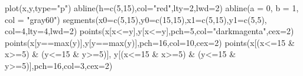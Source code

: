 \documentclass[
]{article}
\newenvironment{Shaded}{\begin{snugshade}}{\end{snugshade}}
\newcommand{\AttributeTok}[1]{\textcolor[rgb]{0.77,0.63,0.00}{#1}}
\newcommand{\DecValTok}[1]{\textcolor[rgb]{0.00,0.00,0.81}{#1}}
\newcommand{\FunctionTok}[1]{\textcolor[rgb]{0.00,0.00,0.00}{#1}}
\newcommand{\NormalTok}[1]{#1}
\newcommand{\SpecialCharTok}[1]{\textcolor[rgb]{0.00,0.00,0.00}{#1}}
\newcommand{\StringTok}[1]{\textcolor[rgb]{0.31,0.60,0.02}{#1}}
\theoremstyle{remark}
\begin{document}
\begin{Shaded}
\begin{Highlighting}[]
\FunctionTok{plot}\NormalTok{(x,y,}\AttributeTok{type=}\StringTok{"p"}\NormalTok{)}
\FunctionTok{abline}\NormalTok{(}\AttributeTok{h=}\FunctionTok{c}\NormalTok{(}\DecValTok{5}\NormalTok{,}\DecValTok{15}\NormalTok{),}\AttributeTok{col=}\StringTok{"red"}\NormalTok{,}\AttributeTok{lty=}\DecValTok{2}\NormalTok{,}\AttributeTok{lwd=}\DecValTok{2}\NormalTok{)}
\FunctionTok{abline}\NormalTok{(}\AttributeTok{a =} \DecValTok{0}\NormalTok{, }\AttributeTok{b =} \DecValTok{1}\NormalTok{, }\AttributeTok{col =} \StringTok{"gray60"}\NormalTok{)}
\FunctionTok{segments}\NormalTok{(}\AttributeTok{x0=}\FunctionTok{c}\NormalTok{(}\DecValTok{5}\NormalTok{,}\DecValTok{15}\NormalTok{),}\AttributeTok{y0=}\FunctionTok{c}\NormalTok{(}\DecValTok{15}\NormalTok{,}\DecValTok{15}\NormalTok{),}\AttributeTok{x1=}\FunctionTok{c}\NormalTok{(}\DecValTok{5}\NormalTok{,}\DecValTok{15}\NormalTok{),}\AttributeTok{y1=}\FunctionTok{c}\NormalTok{(}\DecValTok{5}\NormalTok{,}\DecValTok{5}\NormalTok{),}
\AttributeTok{col=}\DecValTok{4}\NormalTok{,}\AttributeTok{lty=}\DecValTok{4}\NormalTok{,}\AttributeTok{lwd=}\DecValTok{2}\NormalTok{)}
\FunctionTok{points}\NormalTok{(x[x}\SpecialCharTok{\textless{}=}\NormalTok{y],y[x}\SpecialCharTok{\textless{}=}\NormalTok{y],}\AttributeTok{pch=}\DecValTok{5}\NormalTok{,}\AttributeTok{col=}\StringTok{"darkmagenta"}\NormalTok{,}\AttributeTok{cex=}\DecValTok{2}\NormalTok{)}
\FunctionTok{points}\NormalTok{(x[y}\SpecialCharTok{==}\FunctionTok{max}\NormalTok{(y)],y[y}\SpecialCharTok{==}\FunctionTok{max}\NormalTok{(y)],}\AttributeTok{pch=}\DecValTok{16}\NormalTok{,}\AttributeTok{col=}\DecValTok{10}\NormalTok{,}\AttributeTok{cex=}\DecValTok{2}\NormalTok{)}
\FunctionTok{points}\NormalTok{(x[(x}\SpecialCharTok{\textless{}=}\DecValTok{15} \SpecialCharTok{\&}\NormalTok{ x}\SpecialCharTok{\textgreater{}=}\DecValTok{5}\NormalTok{) }\SpecialCharTok{\&}\NormalTok{ (y}\SpecialCharTok{\textless{}=}\DecValTok{15} \SpecialCharTok{\&}\NormalTok{ y}\SpecialCharTok{\textgreater{}=}\DecValTok{5}\NormalTok{)],}
\NormalTok{y[(x}\SpecialCharTok{\textless{}=}\DecValTok{15} \SpecialCharTok{\&}\NormalTok{ x}\SpecialCharTok{\textgreater{}=}\DecValTok{5}\NormalTok{) }\SpecialCharTok{\&}\NormalTok{ (y}\SpecialCharTok{\textless{}=}\DecValTok{15} \SpecialCharTok{\&}\NormalTok{ y}\SpecialCharTok{\textgreater{}=}\DecValTok{5}\NormalTok{)],}\AttributeTok{pch=}\DecValTok{16}\NormalTok{,}\AttributeTok{col=}\DecValTok{3}\NormalTok{,}\AttributeTok{cex=}\DecValTok{2}\NormalTok{)}
\end{Highlighting}
\end{Shaded}
\end{document}

